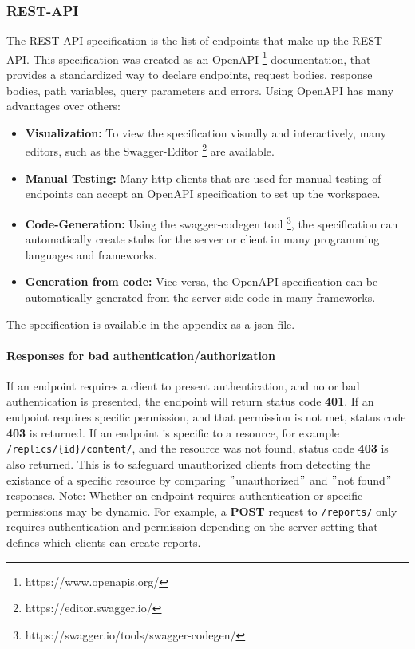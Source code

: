 \subsubsection{REST-API}
The REST-API specification is the list of endpoints that make up the REST-API\@.
This specification was created as an OpenAPI \footnote{https://www.openapis.org/} documentation, that provides a standardized way to declare endpoints, request bodies, response bodies, path variables, query parameters and errors.
Using OpenAPI has many advantages over others:
\begin{itemize}
    \item \textbf{Visualization:} To view the specification visually and interactively, many editors, such as the Swagger-Editor \footnote{https://editor.swagger.io/} are available.
    \item \textbf{Manual Testing:} Many http-clients that are used for manual testing of endpoints can accept an OpenAPI specification to set up the workspace.
    \item \textbf{Code-Generation:} Using the swagger-codegen tool \footnote{https://swagger.io/tools/swagger-codegen/}, the specification can automatically create stubs for the server or client in many programming languages and frameworks.
    \item \textbf{Generation from code:} Vice-versa, the OpenAPI-specification can be automatically generated from the server-side code in many frameworks.
\end{itemize}

The specification is available in the appendix as a json-file. \newline

\paragraph{Responses for bad authentication/authorization}
If an endpoint requires a client to present authentication, and no or bad authentication is presented, the endpoint will return status code \textbf{401}. \newline
If an endpoint requires specific permission, and that permission is not met, status code \textbf{403} is returned.
If an endpoint is specific to a resource, for example \texttt{/replics/\{id\}/content/}, and the resource was not found, status code \textbf{403} is also returned.
This is to safeguard unauthorized clients from detecting the existance of a specific resource by comparing \("\)unauthorized\("\) and \("\)not found\("\) responses. \newline
Note: Whether an endpoint requires authentication or specific permissions may be dynamic.
For example, a \textbf{POST} request to \texttt{/reports/} only requires authentication and permission depending on the server setting that defines which clients can create reports.


